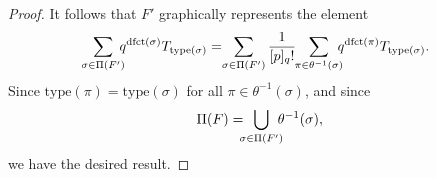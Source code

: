 \documentclass[12pt]{amsart}
\theoremstyle{definition}
\numberwithin{equation}{section}
\newcommand{\sn}{\mathfrak{S}_n}
\newcommand{\dfct}{\mathrm{dfct}}
\newcommand{\type}{\mathrm{type}}
\newcommand{\ntksp}{\negthickspace}
\newcommand{\nTksp}{\negthickspace\negthickspace}
\begin{document}
\begin{proof}
It follows that
$F'$ graphically represents the element
    \begin{equation}\label{eq:qfactsum}
        \nTksp\sum_{\sigma \in \Pi(F')}\nTksp q^{\dfct(\sigma)}T_{\type(\sigma)}
        = \ntksp \sum_{\sigma \in \Pi(F')} 
        \frac 1{[p]_q!}
        \ntksp \sum_{\pi \in \theta^{-1}(\sigma)} \nTksp q^{\dfct(\pi)} T_{\type(\sigma)}.
        \end{equation}
        Since  $\type(\pi) = \type(\sigma)$
        for all $\pi \in \theta^{-1}(\sigma)$, and since
       \begin{equation*}
            \Pi(F) = \nTksp \bigcup_{\sigma \in \Pi(F')}\nTksp \theta^{-1}(\sigma),
        \end{equation*}
        we have the desired result.
%                
\end{proof}
\end{document}
